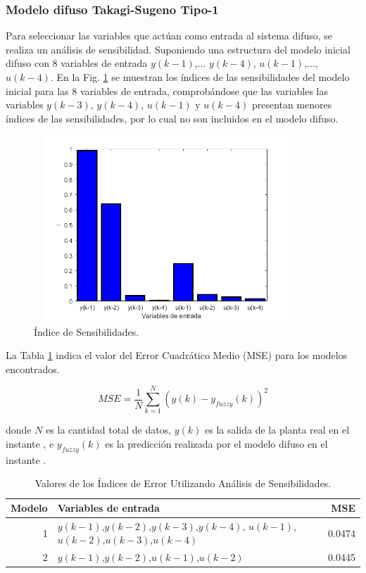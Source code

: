 \documentclass[12pt]{article}
\begin{document}
\subsubsection{Modelo difuso Takagi-Sugeno Tipo-1}

Para seleccionar las variables que actúan como entrada al sistema difuso, se realiza un análisis de sensibilidad. Suponiendo una estructura del modelo inicial difuso con 8 variables de entrada $y(k-1)$,... $y(k-4)$, $u(k-1)$,...,$u(k-4)$. En la Fig. \ref{f_P1Sensibilidad} se muestran los índices de las sensibilidades del modelo inicial para las 8
variables de entrada, comprobándose que las variables las variables $y(k-3)$, $y(k-4)$, $u(k-1)$ y $u(k-4)$ presentan menores índices de las sensibilidades, por lo cual no son incluidos en el modelo difuso.

\begin{figure}
\centering
\includegraphics[width=10cm,height=7cm]{imag/P1Sensibilidad}
\caption{Índice de Sensibilidades.}
\label{f_P1Sensibilidad}
\end{figure}

La Tabla \ref{t_Error} indica el valor del Error Cuadrático Medio (MSE) para los modelos encontrados.


\begin{equation}
MSE=\frac{1}{N}\sum_{k=1}^{N}(y(k)-y_{fuzzy}(k))^2
\label{e_MSE}
\end{equation}

donde $N$ es la cantidad total de datos, $y(k)$ es la salida de la planta real en el instante , e $y_{fuzzy}(k)$ es la predicción realizada por el modelo difuso en el instante .

\begin{table}[htbp]
  \centering
  \caption{Valores de los Índices de Error Utilizando Análisis de Sensibilidades.}
    \begin{tabular}{|r|l|r|}
    \toprule
    \multicolumn{1}{|p{4.055em}|}{Modelo } & \multicolumn{1}{p{5.555em}|}{Variables de entrada } & \multicolumn{1}{p{4.055em}|}{MSE} \\
    \midrule
    1     & $y(k-1)$,$y(k-2)$,$y(k-3)$,$y(k-4)$, $u(k-1)$,$u(k-2)$,$u(k-3)$,$u(k-4)$     & 0.0474 \\
    \midrule
    2     & $y(k-1)$,$y(k-2)$,$u(k-1)$,$u(k-2)$    & 0.0445 \\
    \bottomrule
    \end{tabular}%
  \label{t_Error}%
\end{table}%
\end{document}

